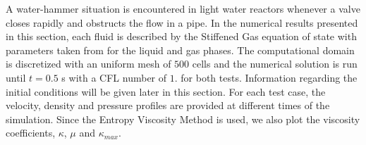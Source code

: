 \documentclass{mc2015}
\begin{document}
A water-hammer situation is encountered in light water reactors whenever a valve closes rapidly and obstructs the flow in a pipe. In the numerical results presented in this section, each fluid is described by the Stiffened Gas equation of state with parameters taken from \cite{SGEOS} for the liquid and gas phases. The computational domain is discretized with an uniform mesh of $500$ cells and the numerical solution is run until $t = 0.5$ s with a CFL number of $1.$ for both tests. Information regarding the initial conditions will be given later in this section. 
For each test case, the velocity, density and pressure profiles are provided at different times of the simulation. Since the Entropy Viscosity Method is used, we also plot the viscosity coefficients, $\kappa$, $\mu$ and $\kappa_{max}$.
%
\end{document}
